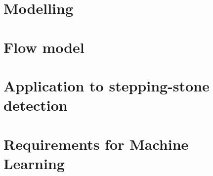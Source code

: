 \documentclass[a4paper,12pt,twoside]{report}
\begin{document}
%
%



\chapter{Modelling}


\chapter{Flow model}


\chapter{Application to stepping-stone detection}


\chapter{Requirements for Machine Learning}






\end{document}
